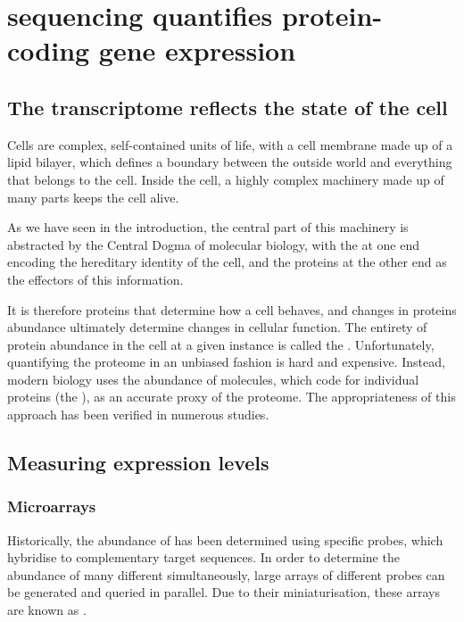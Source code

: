 \chapter{ sequencing quantifies protein-coding gene expression}

\section{The transcriptome reflects the state of the cell}

Cells are complex, self-contained units of life, with a cell membrane made up of
a lipid bilayer, which defines a boundary between the outside world and
everything that belongs to the cell. Inside the cell, a highly complex machinery
made up of many parts keeps the cell alive.

As we have seen in the introduction, the central part of this machinery is
abstracted by the Central Dogma of molecular biology, with the \dna at one end
encoding the hereditary identity of the cell, and the proteins at the other end
as the effectors of this information.

It is therefore proteins that determine how a cell behaves, and changes in
proteins abundance ultimately determine changes in cellular function. The
entirety of protein abundance in the cell at a given instance is called the
. Unfortunately, quantifying the proteome in an unbiased
fashion is hard and expensive\todo[ref]{}. Instead, modern biology uses the
abundance of \mrna molecules, which code for individual proteins (the
), as an accurate proxy of the proteome. The
appropriateness of this approach has been verified in numerous
studies\todo[ref]{}.

\section{Measuring  expression levels}


\subsection{Microarrays}

Historically, the abundance of \mrna has been determined using specific probes,
which hybridise to complementary target \mrna sequences. In order to determine
the abundance of many different \mrna[s] simultaneously, large arrays of
different probes can be generated and queried in parallel. Due to their
miniaturisation, these arrays are known as \citep{Schena:1995}.

